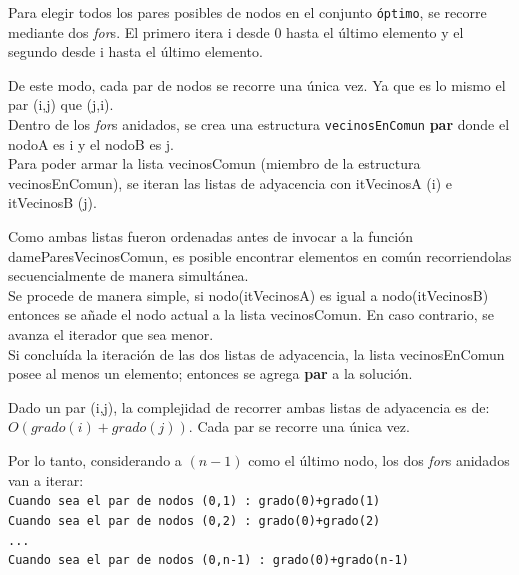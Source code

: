 \newpage
Para elegir todos los pares posibles de nodos en el conjunto \texttt{\'optimo}, se recorre mediante dos \emph{for}s. El primero itera i desde 0 hasta el \'ultimo elemento y el segundo desde i hasta el \'ultimo elemento.

De este modo, cada par de nodos se recorre una \'unica vez. Ya que es lo mismo el par (i,j) que (j,i).\\

Dentro de los \emph{for}s anidados, se crea una estructura \texttt{vecinosEnComun} \textbf{par} donde el nodoA es i y el nodoB es j.\\

Para poder armar la lista vecinosComun (miembro de la estructura vecinosEnComun), se iteran las listas de adyacencia con itVecinosA (i) e itVecinosB (j).

Como ambas listas fueron ordenadas antes de invocar a la funci\'on dameParesVecinosComun, es posible encontrar elementos en com\'un recorriendolas secuencialmente de manera simult\'anea.\\

Se procede de manera simple, si nodo(itVecinosA) es igual a nodo(itVecinosB) entonces se a\~nade el nodo actual a la lista vecinosComun. En caso contrario, se avanza el iterador que sea menor.\\

Si conclu\'ida la iteraci\'on de las dos listas de adyacencia, la lista vecinosEnComun posee al menos un elemento; entonces se agrega \textbf{par} a la soluci\'on.\\

\bigskip

Dado un par (i,j), la complejidad de recorrer ambas listas de adyacencia es de: $O(grado(i)+grado(j))$. Cada par se recorre una \'unica vez. 

Por lo tanto, considerando a $(n-1)$ como el \'ultimo nodo, los dos \emph{for}s anidados van a iterar:\\

\texttt{Cuando sea el par de nodos (0,1) : grado(0)+grado(1)}\\

\texttt{Cuando sea el par de nodos (0,2) : grado(0)+grado(2)}\\

\texttt{...}\\

\texttt{Cuando sea el par de nodos (0,n-1) : grado(0)+grado(n-1)}\\

